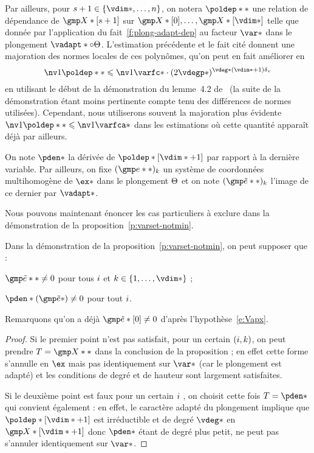 Par ailleurs, pour \( \indi \in \set{\vdim*, \dots, n} \), on notera \(
  \poldep** \) \label{p:def-poldep} une relation de dépendance de \(
  \vmp*[\indi] \) sur \(
  \vmp*[0], \dots, \vmp*[\vdim*] \) telle que donnée par l'application du
fait~\vref{f:plong-adapt-dep} au facteur \( \var* \) dans le plongement \(
  \vadapt* \circ \vaemb \). L'estimation précédente et le fait cité donnent
une majoration des normes locales de ces polynômes, qu'on peut en fait
améliorer en
\begin{equation} \label{e:nv-poldep}
  \nv1{\poldep**} \le \nv1{\varfc*}
  \cdot ( 2 \vdegp* )^{\vdeg* (\vdim* + 1) \dv}
\end{equation}
en utilisant le début de la démonstration du lemme~4.2 de~\cite{remivds} (la
suite de la démonstration étant moins pertinente compte tenu des différences
de normes utilisées). Cependant, nous utiliserons souvent la majoration plus
évidente \( \nv1{\poldep**} \le \nv1{\varfca*} \) dans les estimations où
cette quantité apparaît déjà par ailleurs.

\begin{nota} \label{n:pden-cexa}
  On note \( \pden* \) la dérivée de \( \poldep*[\vdim*+1] \) par rapport à la
  dernière variable.  Par ailleurs, on fixe \( (\cex**)_\ind \) un système de
  coordonnées multihomogène de \( \ex* \) dans le plongement \( \Theta \) et
  on note \( (\cexa**)_\ind \) l'image de ce dernier par \( \vadapt* \).
\end{nota}

Nous pouvons maintenant énoncer les cas particuliers à exclure dans la
démonstration de la proposition~\vref{p:varset-notmin}.

\begin{sco} \label{s:part-cases}
  Dans la démonstration de la proposition~\vref{p:varset-notmin}, on peut
  supposer que :
  \begin{enumthm}
    \item \( \cexa** \neq 0 \) pour tous \( i \) et \( \ind \in \set{1,
          \dots, \vdim*} \) ;
    \item \( \pden*(\cexa*) \neq 0 \) pour tout \( i \).
  \end{enumthm}
  Remarquons qu'on a déjà \( \cexa*[0] \neq 0 \) d'après
  l'hypothèse~\eqref{e:Vapx}.
\end{sco}

\begin{proof}
  Si le premier point n'est pas satisfait, pour un certain \( (i, k) \),
  on peut prendre \( T = \vmp** \) dans la conclusion de la
  proposition ; en effet cette forme s'annulle en \( \ex \) mais pas
  identiquement sur \( \var* \) (car le plongement est adapté) et les
  conditions de degré et de hauteur sont largement satisfaites.

  Si le deuxième point est faux pour un certain \( i \) , on choisit cette
  fois \( T = \pden* \) qui convient également : en effet, le caractère adapté
  du plongement implique que \( \poldep*[\vdim*+1] \) est irréductible et de
  degré \( \vdeg* \) en \( \vmp*[\vdim*+1] \) donc \( \pden* \) étant de degré
  plus petit, ne peut pas s'annuler identiquement sur \( \var* \).
\end{proof}

